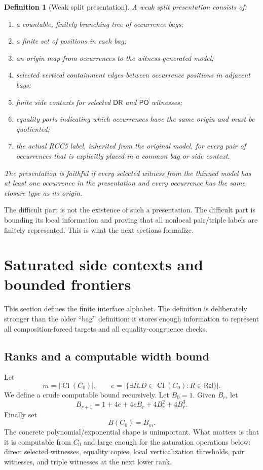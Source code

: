 \documentclass[11pt]{article}
\newtheorem{definition}[theorem]{Definition}
\newcommand{\Rel}{\mathsf{Rel}}
\newcommand{\PO}{\mathsf{PO}}
\newcommand{\DR}{\mathsf{DR}}
\newcommand{\Cl}{\operatorname{Cl}}
\begin{document}
\begin{definition}[Weak split presentation]
A weak split presentation consists of:
\begin{enumerate}[label=(S\arabic*)]
\item a countable, finitely branching tree of occurrence bags;
\item a finite set of positions in each bag;
\item an origin map from occurrences to the witness-generated model;
\item selected vertical containment edges between occurrence positions in adjacent bags;
\item finite side contexts for selected $\DR$ and $\PO$ witnesses;
\item equality ports indicating which occurrences have the same origin and must be quotiented;
\item the actual RCC5 label, inherited from the original model, for every pair of occurrences that is explicitly placed in a common bag or side context.
\end{enumerate}
The presentation is \emph{faithful} if every selected witness from the thinned model has at least one occurrence in the presentation and every occurrence has the same closure type as its origin.
\end{definition}

The difficult part is not the existence of such a presentation.  The difficult part is bounding its local information and proving that all nonlocal pair/triple labels are finitely represented.  This is what the next sections formalize.

\section{Saturated side contexts and bounded frontiers}

This section defines the finite interface alphabet.  The definition is deliberately stronger than the older ``bag'' definition: it stores enough information to represent all composition-forced targets and all equality-congruence checks.

\subsection{Ranks and a computable width bound}

Let
\[
  m=|\Cl(C_0)|,
  \qquad
  e=|\{\exists R.D\in\Cl(C_0):R\in\Rel\}|.
\]
We define a crude computable bound recursively.  Let $B_0=1$.  Given $B_r$, let
\[
  B_{r+1}=1+4e+4eB_r+4B_r^2+4B_r^3.
\]
Finally set
\[
  B(C_0)=B_m.
\]
The concrete polynomial/exponential shape is unimportant.  What matters is that it is computable from $C_0$ and large enough for the saturation operations below: direct selected witnesses, equality copies, local verticalization thresholds, pair witnesses, and triple witnesses at the next lower rank.
\end{document}
